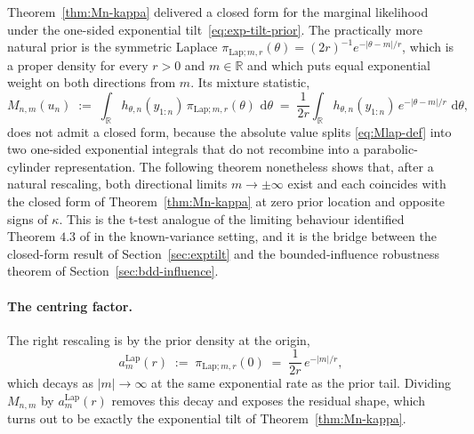 \documentclass[12pt, a4paper]{report}
\newcommand{\dd}{\,\mathrm{d}}
\newcommand{\Lap}{\mathrm{Lap}}
\newcommand{\1}{\mathbf{1}}
\begin{document}
Theorem~\ref{thm:Mn-kappa} delivered a closed form for the marginal
likelihood under the one-sided exponential tilt~\eqref{eq:exp-tilt-prior}.
The practically more natural prior is the symmetric Laplace
$\pi_{\Lap;m,r}(\theta) = (2r)^{-1}e^{-|\theta-m|/r}$, which is a proper
density for every $r>0$ and $m\in\mathbb{R}$ and which puts equal exponential
weight on both directions from $m$. Its mixture statistic,
\begin{equation}\label{eq:Mlap-def}
  M_{n,m}(u_n)
  \;:=\;\int_\mathbb{R} h_{\theta,n}(y_{1:n})\,
  \pi_{\Lap;m,r}(\theta)\,\dd\theta
  \;=\;\frac{1}{2r}\int_\mathbb{R} h_{\theta,n}(y_{1:n})\,
  e^{-|\theta-m|/r}\,\dd\theta,
\end{equation}
does not admit a closed form, because the absolute value splits \eqref{eq:Mlap-def} into two one-sided exponential integrals that do
not recombine into a parabolic-cylinder representation. The following theorem nonetheless shows that, after a natural rescaling, both directional limits $m\to\pm\infty$ exist and each coincides with
the closed form of Theorem~\ref{thm:Mn-kappa} at zero prior location
and opposite signs of $\kappa$. This is the t-test analogue of the
limiting behaviour identified Theorem $4.3$ of \cite{Cortinovis2025} in the known-variance setting, and it is the bridge between the closed-form result of Section~\ref{sec:exptilt} and the bounded-influence
robustness theorem of Section~\ref{sec:bdd-influence}.

\paragraph{The centring factor.}
The right rescaling is by the prior density at the origin,
\begin{equation}\label{eq:am-def}
  a_m^{\Lap}(r)
  \;:=\;\pi_{\Lap;m,r}(0)
  \;=\;\frac{1}{2r}\,e^{-|m|/r},
\end{equation}
which decays as $|m|\to\infty$ at the same exponential rate as the
prior tail. Dividing $M_{n,m}$ by $a_m^{\Lap}(r)$ removes this decay
and exposes the residual shape, which turns out to be exactly the
exponential tilt of Theorem~\ref{thm:Mn-kappa}.
\end{document}
